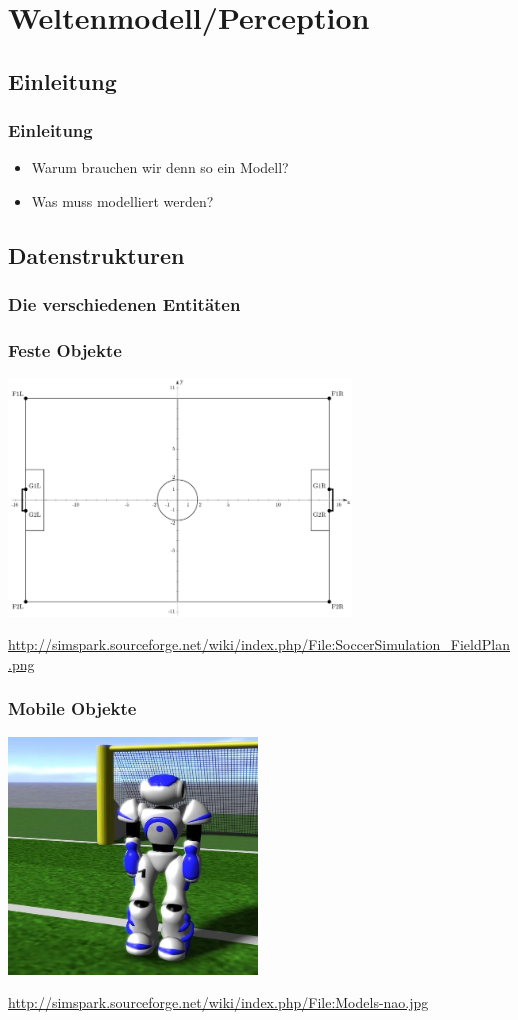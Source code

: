 \section{Weltenmodell/Perception}
\subsection{Einleitung}
\frame
{\frametitle{Einleitung}
\begin{itemize}
    \item Warum brauchen wir denn so ein Modell?
    \item Was muss modelliert werden?
\end{itemize}
}

\subsection{Datenstrukturen}
\subsubsection{Die verschiedenen Entitäten}

\frame
{\frametitle{Feste Objekte}
\begin{center}\includegraphics[height=6.3cm, center]{800px-SoccerSimulation_FieldPlan.png}\end{center}
\url{http://simspark.sourceforge.net/wiki/index.php/File:SoccerSimulation_FieldPlan.png}
}

\frame
{\frametitle{Mobile Objekte}
\begin{center}\includegraphics[height=6.3cm, center]{629px-Models-nao.jpg}\end{center}
\url{http://simspark.sourceforge.net/wiki/index.php/File:Models-nao.jpg}		%
}
